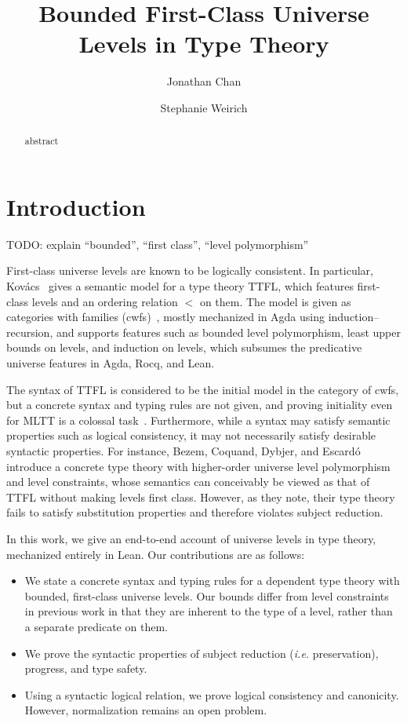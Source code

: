 \documentclass[a4paper,UKenglish,cleveref,autoref,thm-restate]{lipics-v2021}
\title{Bounded First-Class Universe Levels \titlebreak in Type Theory}
\author{Jonathan Chan}
  {University of Pennsylvania, Philadelphia, USA}
  {jcxz@seas.upenn.edu}
  {0000-0003-0830-3180}
  {}
\author{Stephanie Weirich}
  {University of Pennsylvania, Philadelphia, USA}
  {sweirich@seas.upenn.edu}
  {0000-0002-6756-9168}
  {}
\makeatletter
\newcommand{\citep}[1]{\cite{#1}}
\newcommand{\ie}{\textit{i.e.}\@\xspace}
\makeatother
\begin{document}
\maketitle

\begin{abstract}
  abstract
\end{abstract}

\section{Introduction}

TODO: explain ``bounded'', ``first class'', ``level polymorphism''

First-class universe levels are known to be logically consistent.
In particular, Kov\'{a}cs~\citep{gen-univ} gives a semantic model for a type theory TTFL,
which features first-class levels and an ordering relation $<$ on them.
The model is given as categories with families (cwfs)~\citep{cwf},
mostly mechanized in Agda using induction--recursion,
and supports features such as bounded level polymorphism,
least upper bounds on levels, and induction on levels,
which subsumes the predicative universe features in Agda, Rocq, and Lean.

The syntax of TTFL is considered to be the initial model in the category of cwfs,
but a concrete syntax and typing rules are not given,
and proving initiality even for MLTT is a colossal task~\citep{initiality}.
Furthermore, while a syntax may satisfy semantic properties such as logical consistency,
it may not necessarily satisfy desirable syntactic properties.
For instance, Bezem, Coquand, Dybjer, and Escard\'o~\citep{univ-poly}
introduce a concrete type theory with higher-order universe level polymorphism and level constraints,
whose semantics can conceivably be viewed as that of TTFL without making levels first class.
However, as they note, their type theory fails to satisfy substitution properties
and therefore violates subject reduction.

In this work, we give an end-to-end account of universe levels in type theory,
mechanized entirely in Lean.
Our contributions are as follows:

\begin{itemize}
  \item We state a concrete syntax and typing rules for a dependent type theory with
    bounded, first-class universe levels.
    Our bounds differ from level constraints in previous work in that
    they are inherent to the type of a level,
    rather than a separate predicate on them.
  \item We prove the syntactic properties of subject reduction (\ie preservation),
    progress, and type safety.
  \item Using a syntactic logical relation, we prove logical consistency and canonicity.
    However, normalization remains an open problem.
\end{itemize}
\end{document}
